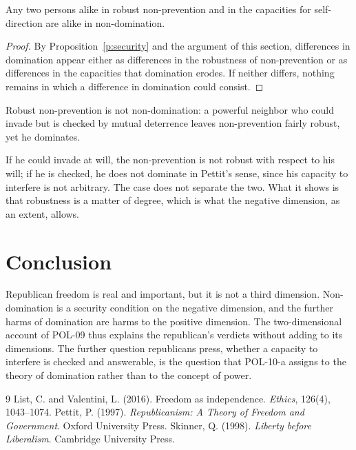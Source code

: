 \documentclass{situationist-preprint}
\begin{document}
\begin{corollary}\label{c:supervene}
Any two persons alike in robust non-prevention and in the capacities for self-direction are alike in non-domination.
\end{corollary}

\begin{proof}
By Proposition~\ref{p:security} and the argument of this section, differences in domination appear either as differences in the robustness of non-prevention or as differences in the capacities that domination erodes. If neither differs, nothing remains in which a difference in domination could consist.
\end{proof}

\begin{objection}
Robust non-prevention is not non-domination: a powerful neighbor who could invade but is checked by mutual deterrence leaves non-prevention fairly robust, yet he dominates.
\end{objection}

\begin{reply}
If he could invade at will, the non-prevention is not robust with respect to his will; if he is checked, he does not dominate in Pettit's sense, since his capacity to interfere is not arbitrary. The case does not separate the two. What it shows is that robustness is a matter of degree, which is what the negative dimension, as an extent, allows.
\end{reply}

\section{Conclusion}

Republican freedom is real and important, but it is not a third dimension. Non-domination is a security condition on the negative dimension, and the further harms of domination are harms to the positive dimension. The two-dimensional account of POL-09 thus explains the republican's verdicts without adding to its dimensions. The further question republicans press, whether a capacity to interfere is checked and answerable, is the question that POL-10-a assigns to the theory of domination rather than to the concept of power.

\begin{thebibliography}{9}
 List, C. and Valentini, L. (2016). Freedom as independence. \emph{Ethics}, 126(4), 1043--1074.
 Pettit, P. (1997). \emph{Republicanism: A Theory of Freedom and Government}. Oxford University Press.
 Skinner, Q. (1998). \emph{Liberty before Liberalism}. Cambridge University Press.
\end{thebibliography}
\end{document}
